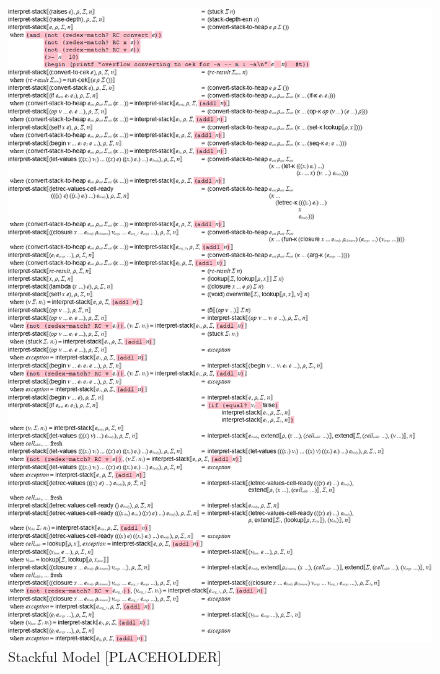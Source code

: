 \begin{appendices}
    \begin{figure}[!h]
        \centering
        \includegraphics[scale=0.4]{sections/figures/interpret-stack-full.png}
        \caption{Stackful Model [PLACEHOLDER]}
        \label{fig:interpret-stack-full}
    \end{figure}

\end{appendices}